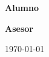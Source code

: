 \begin{titlepage}
	{\Large \program \par}
	\vfill
	
	
	{\Large\bfseries Alumno \par}
	{\Large \authorname \par}
	{\large \href{mailto:\authoremail}{\texttt{\authoremail}} \par}
	
	\vfill
	
	
	{\Large\bfseries Asesor \par}
	{\Large \supervisor \par}
	{\large \href{mailto:\supervisoremail}{\texttt{\supervisoremail}} \par}
	
	
		
	\vfill
	
	{\Large \today \par}
	
	
	
\end{titlepage}
